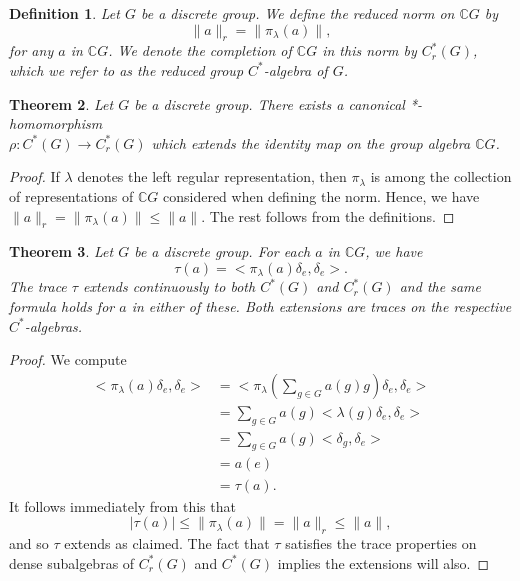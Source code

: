 \documentclass{book}
\newtheorem{definition}{Definition}[section]
\newtheorem{theorem}[definition]{Theorem}
\def\cstar{\(C^*\)-algebra}
\def\cstars{\(C^*\)-algebras}
\begin{document}
\begin{definition}
  Let \(G\) be a discrete group. We define the reduced norm
  on \(\mathbb{C}G\) by
  \[\|a\|_r = \|\pi_\lambda(a)\|,\]
  for any \(a\) in \(\mathbb{C}G\). We denote the completion of \(\mathbb{C}G\) in this norm by \(C^*_r(G)\),
  which we refer to as the \textnormal{reduced group \cstar} of \(G\).
\end{definition}
\begin{theorem}\label{theorem:2410}
  Let \(G\) be a discrete group. There exists a canonical 
  *-homomorphism\\ \(\rho : C^*(G)\rightarrow C^*_r(G)\) which extends the identity map on the
  group algebra \(\mathbb{C}G\).
\end{theorem}
\begin{proof}
  If \(\lambda\) denotes the left regular representation, then \(\pi_\lambda\) is among the 
  collection of representations of \(\mathbb{C}G\) considered when defining the norm. Hence,
  we have \(\|a\|_r = \|\pi_\lambda(a)\| \leq \|a\|\). The rest follows from the definitions.
\end{proof}
\begin{theorem}
  Let \(G\) be a discrete group. For each \(a\) in \(\mathbb{C}G\), we have
  \[\tau(a) =< \pi_\lambda(a)\delta_e,\delta_e > .\]
  The trace \(\tau\) extends continuously to both \(C^*(G)\) and \(C^*_r(G)\) and the same
  formula holds for \(a\) in either of these. Both extensions are traces on the
  respective \cstars.
\end{theorem}
\begin{proof}
  We compute
  \begin{align*}
    <\pi_\lambda(a)\delta_e,\delta_e > &= < \pi_\lambda(\sum_{g\in G}a(g)g)\delta_e, \delta_e >\\
    &=\sum_{g\in G}a(g) < \lambda(g)\delta_e,\delta_e >\\
    &=\sum_{g\in G} a(g) < \delta_g,\delta_e >\\
    &= a(e)\\
    &= \tau(a).
  \end{align*}
  It follows immediately from this that
  \[|\tau(a)| \leq \|\pi_\lambda(a)\| = \|a\|_r \leq \|a\| ,\]
  and so \(\tau\) extends as claimed. The fact that \(\tau\) satisfies the trace properties on
  dense subalgebras of \(C^*_r(G)\) and \(C^*(G)\) implies the extensions will also.
\end{proof}
\end{document}
